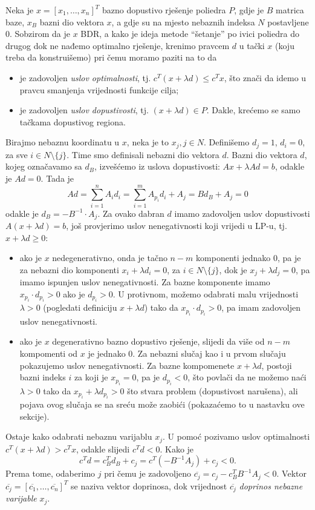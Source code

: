 \documentclass[a4paper, utf8, 11pt, colorlinks]{article}
\begin{document}
 Neka je $x = [x_1,\ldots, x_n]^T$ bazno dopustivo rješenje poliedra $P$, gdje je $B$ matrica baze, $x_B$ bazni dio vektora $x$, a gdje su na mjesto nebaznih indeksa $N$ postavljene 0.  Sobzirom da je $x$ BDR, a kako je ideja metode ``šetanje'' po ivici poliedra  do drugog dok ne nađemo optimalno rješenje, krenimo pravcem $d$ u  tački $x$ (koju  treba da konstruišemo) pri čemu moramo paziti na to da
\begin{itemize}
    \item je zadovoljen \emph{uslov optimalnosti}, tj. $c^T (x + \lambda d) \leq c^T x$, što znači da idemo u pravcu smanjenja vrijednosti funkcije cilja;
    \item je zadovoljen \emph{uslov dopustivosti}, tj. $ (x + \lambda d) \in P$. Dakle, krećemo se samo tačkama dopustivog regiona. 
\end{itemize}
Birajmo nebaznu koordinatu u $x$, neka je to $x_j, j \in N$. Definišemo $d_j =1$, $d_i = 0$, za sve $i \in N  \setminus \{j\}$. Time smo definisali nebazni
dio vektora $d$. Bazni dio vektora $d$, kojeg označavamo sa $d_B$, izvešćemo iz uslova dopustivosti: $Ax + \lambda Ad = b$, odakle je $Ad = 0$. Tada je 
$$ Ad = \sum_{i=1}^n A_i d_i = \sum_{i=1}^m A_{p_i} d_i + A_j = B d_B + A_j = 0$$
odakle je $d_B = -  B^{-1} \cdot A_j $.  Za ovako dabran $d$ imamo zadovoljen uslov dopustivosti $A( x + \lambda d )  =b$, još provjerimo uslov nenegativnosti koji vrijedi u LP-u, tj. $x + \lambda d \geq 0$:
\begin{itemize}
    \item ako je $x$ nedegenerativno, onda je tačno $n-m$ komponenti jednako 0,       pa je za nebazni dio komponenti $x_i + \lambda d_i = 0$, za $i \in N \setminus \{j\}$, dok je $x_j + \lambda d_j = 0$, pa imamo ispunjen uslov nenegativnosti. Za bazne komponente imamo $x_{p_i} \cdot d_{p_i} > 0 $ ako je $d_{p_i}>0$. U protivnom, možemo odabrati  malu vrijednosti $\lambda>0$ (pogledati definiciju $x +\lambda d$) tako da $x_{p_i} \cdot d_{p_i} >0$, pa imam zadovoljen uslov nenegativnosti.
    \item ako je $x$ degenerativno bazno dopustivo rješenje, slijedi da više od $n-m$ kompomenti od $x$ je jednako 0. Za nebazni slučaj kao i u prvom slučaju pokazujemo uslov nenegativnosti. Za bazne kompomenete $x +\lambda d$,  postoji bazni indeks $i$ za koji je $x_{p_i} = 0$, pa   je $d_{p_i}< 0$, što povlači da ne možemo naći $\lambda>0$ tako da $x_{p_i} + \lambda d_{p_i} >0$  što stvara problem (dopustivost narušena), ali pojava ovog slučaja se na sreću može zaobići (pokazaćemo to u nastavku ove sekcije). 
\end{itemize}
 Ostaje kako odabrati nebaznu varijablu $x_j$. U pomoć pozivamo uslov optimalnosti $c^T ( x + \lambda d ) > c^T x $, odakle slijedi $c^T d < 0$.  Kako je $$c^T d = c_B^T d_B + c_j = c^T ( - B^{-1} A_j ) + c_j < 0.$$
 Prema tome, odaberimo $j$ pri čemu je zadovoljeno $ \overline{c_j} = c_j - c_B^T B^{-1}A_j < 0$. Vektor $\overline{c_j}=[\overline{c_1}, \ldots, \overline{c_n}]^T$ se naziva vektor doprinosa, dok vrijednost $\overline{c_j}$ \emph{doprinos nebazne varijable} $x_j$. 
 
\end{document}
